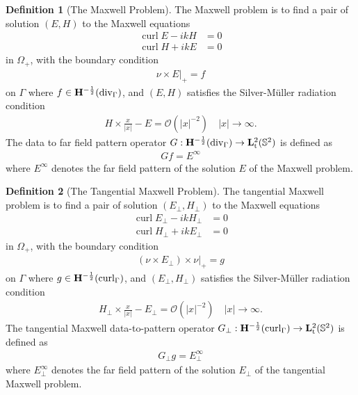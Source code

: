 \documentclass[a4paper,12pt]{article}
\theoremstyle{definition}
\newtheorem{dfn}{Definition}
\newcommand\bdr{\Gamma}
\newcommand\Div{\divv_\bdr}
\newcommand\Curl{\curl_\bdr}
\newcommand\lTT{{\bf L}^2_\text{t}}
\newcommand\lTS{\lTT(\mathbb{S}^2)}
\newcommand\Hhm{{\bf H}^{-\frac{1}{2}}}
\newcommand\lTD{\Hhm(\Div)}
\newcommand\lTC{\Hhm(\Curl)}
\DeclareMathOperator\curl{curl}
\DeclareMathOperator\divv{div}
\begin{document}
\begin{dfn}[The Maxwell Problem]
  The Maxwell problem is to find a pair of solution $(E, H)$ to the Maxwell equations
  \begin{align*}
    \curl E - ikH &= 0\\
    \curl H + ikE &= 0
  \end{align*}
  in $\Omega_+$, with the boundary condition 
  \begin{align}\label{eq:bcmax}
    \nu\times E|_+ = f
  \end{align}  
  on $\bdr$ where $f\in\lTD$, and $(E, H)$ satisfies the Silver-M\"uller radiation condition
  \begin{align}\label{eq:rdmax}
    H\times\frac{x}{|x|} - E = \mathcal{O}\left(|x|^{-2}\right)\quad |x|\to\infty.
  \end{align}
  The data to far field pattern operator $G:\lTD\rightarrow\lTS$ is defined as 
  \begin{align}\label{eq:Gmax}
    G f = E^\infty
  \end{align} 
  where $E^\infty$ denotes the far field pattern of the solution $E$ of the Maxwell problem.
\end{dfn}


\begin{dfn}[The Tangential Maxwell Problem]
  The tangential Maxwell problem is to find a pair of solution $(E_\perp, H_\perp)$ to the Maxwell equations
  \begin{align*}
    \curl E_\perp - ikH_\perp &= 0\\
    \curl H_\perp + ikE_\perp &= 0
  \end{align*}
  in $\Omega_+$, with the boundary condition 
  \begin{align}\label{eq:bcmaxt}
    \left(\nu\times E_\perp\right)\times\nu|_+ = g
  \end{align}  
  on $\bdr$ where $g\in\lTC$, and $(E_\perp, H_\perp)$ satisfies the Silver-M\"uller radiation condition
  \begin{align}\label{eq:rdmaxt}
    H_\perp\times\frac{x}{|x|} - E_\perp = \mathcal{O}\left(|x|^{-2}\right)\quad |x|\to\infty.
  \end{align}
  The tangential Maxwell data-to-pattern operator $G_\perp:\lTC\rightarrow\lTS$ is defined as 
  \begin{align}\label{eq:Gmaxt}
    G_\perp g = E_\perp^\infty
  \end{align} 
  where $E_\perp^\infty$ denotes the far field pattern of the solution $E_\perp$ of the tangential Maxwell problem.
\end{dfn}
\end{document}
